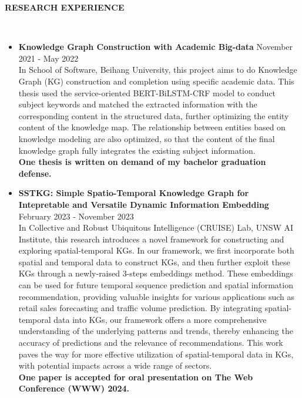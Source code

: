 \documentclass[10pt,article]{article}
\newcommand{\resheading}[1]{%
  {\small\colorbox{mygrey}{%
    \begin{minipage}{0.97\textwidth}\centering\textbf{#1 \vphantom{p\^{E}}}\end{minipage}%
  }}%
}
\begin{document}
\resheading{\textbf{RESEARCH EXPERIENCE}}\\
\begin{itemize}
  \item \textbf{Knowledge Graph Construction with Academic Big-data} \hfill November 2021 - May 2022 \\
  In School of Software, Beihang University, this project aims to do Knowledge Graph (KG) construction and completion using specific academic data. This thesis used the service-oriented BERT-BiLSTM-CRF model to conduct subject keywords and matched the extracted information with the corresponding content in the structured data, further optimizing the entity content of the knowledge map. The relationship between entities based on knowledge modeling are also optimized, so that the content of the final knowledge graph fully integrates the existing subject information. \\
    \textbf{One thesis is written on demand of my bachelor graduation defense.}
  
  \item \textbf{SSTKG: Simple Spatio-Temporal Knowledge Graph for Intepretable and Versatile Dynamic Information Embedding} \\ \hfill February 2023 - November 2023 \\
    In Collective and Robust Ubiquitous Intelligence (CRUISE) Lab, UNSW AI Institute, this research introduces a novel framework for constructing and exploring spatial-temporal KGs. In our framework, we first incorporate both spatial and temporal data to construct KGs, and then further exploit these KGs through a newly-raised 3-steps embeddings method. These embeddings can be used for future temporal sequence prediction and spatial information recommendation, providing valuable insights for various applications such as retail sales forecasting and traffic volume prediction. By integrating spatial-temporal data into KGs, our framework offers a more comprehensive understanding of the underlying patterns and trends, thereby enhancing the accuracy of predictions and the relevance of recommendations. This work paves the way for more effective utilization of spatial-temporal data in KGs, with potential impacts across a wide range of sectors. \\
    \textbf{One paper is accepted for oral presentation on The Web Conference (WWW) 2024.}


\end{itemize}
\end{document}
